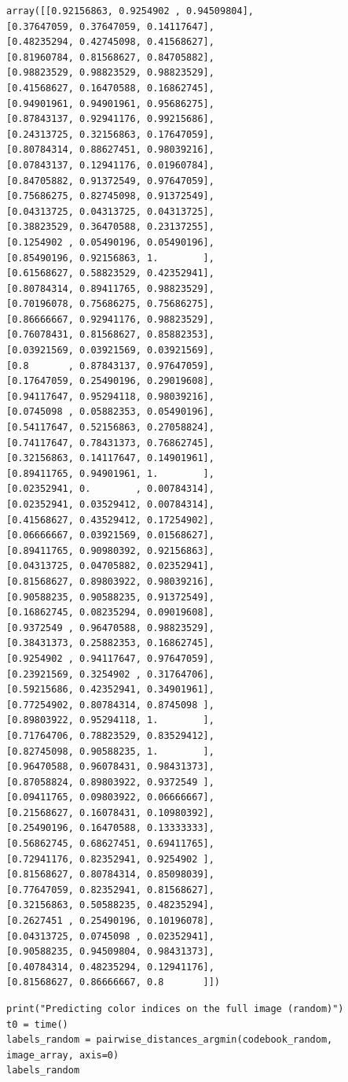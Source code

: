 \documentclass[11pt]{article}
\begin{document}
\begin{verbatim}
array([[0.92156863, 0.9254902 , 0.94509804],
[0.37647059, 0.37647059, 0.14117647],
[0.48235294, 0.42745098, 0.41568627],
[0.81960784, 0.81568627, 0.84705882],
[0.98823529, 0.98823529, 0.98823529],
[0.41568627, 0.16470588, 0.16862745],
[0.94901961, 0.94901961, 0.95686275],
[0.87843137, 0.92941176, 0.99215686],
[0.24313725, 0.32156863, 0.17647059],
[0.80784314, 0.88627451, 0.98039216],
[0.07843137, 0.12941176, 0.01960784],
[0.84705882, 0.91372549, 0.97647059],
[0.75686275, 0.82745098, 0.91372549],
[0.04313725, 0.04313725, 0.04313725],
[0.38823529, 0.36470588, 0.23137255],
[0.1254902 , 0.05490196, 0.05490196],
[0.85490196, 0.92156863, 1.        ],
[0.61568627, 0.58823529, 0.42352941],
[0.80784314, 0.89411765, 0.98823529],
[0.70196078, 0.75686275, 0.75686275],
[0.86666667, 0.92941176, 0.98823529],
[0.76078431, 0.81568627, 0.85882353],
[0.03921569, 0.03921569, 0.03921569],
[0.8       , 0.87843137, 0.97647059],
[0.17647059, 0.25490196, 0.29019608],
[0.94117647, 0.95294118, 0.98039216],
[0.0745098 , 0.05882353, 0.05490196],
[0.54117647, 0.52156863, 0.27058824],
[0.74117647, 0.78431373, 0.76862745],
[0.32156863, 0.14117647, 0.14901961],
[0.89411765, 0.94901961, 1.        ],
[0.02352941, 0.        , 0.00784314],
[0.02352941, 0.03529412, 0.00784314],
[0.41568627, 0.43529412, 0.17254902],
[0.06666667, 0.03921569, 0.01568627],
[0.89411765, 0.90980392, 0.92156863],
[0.04313725, 0.04705882, 0.02352941],
[0.81568627, 0.89803922, 0.98039216],
[0.90588235, 0.90588235, 0.91372549],
[0.16862745, 0.08235294, 0.09019608],
[0.9372549 , 0.96470588, 0.98823529],
[0.38431373, 0.25882353, 0.16862745],
[0.9254902 , 0.94117647, 0.97647059],
[0.23921569, 0.3254902 , 0.31764706],
[0.59215686, 0.42352941, 0.34901961],
[0.77254902, 0.80784314, 0.8745098 ],
[0.89803922, 0.95294118, 1.        ],
[0.71764706, 0.78823529, 0.83529412],
[0.82745098, 0.90588235, 1.        ],
[0.96470588, 0.96078431, 0.98431373],
[0.87058824, 0.89803922, 0.9372549 ],
[0.09411765, 0.09803922, 0.06666667],
[0.21568627, 0.16078431, 0.10980392],
[0.25490196, 0.16470588, 0.13333333],
[0.56862745, 0.68627451, 0.69411765],
[0.72941176, 0.82352941, 0.9254902 ],
[0.81568627, 0.80784314, 0.85098039],
[0.77647059, 0.82352941, 0.81568627],
[0.32156863, 0.50588235, 0.48235294],
[0.2627451 , 0.25490196, 0.10196078],
[0.04313725, 0.0745098 , 0.02352941],
[0.90588235, 0.94509804, 0.98431373],
[0.40784314, 0.48235294, 0.12941176],
[0.81568627, 0.86666667, 0.8       ]])
\end{verbatim}

\begin{verbatim}
print("Predicting color indices on the full image (random)")
t0 = time()
labels_random = pairwise_distances_argmin(codebook_random, image_array, axis=0)
labels_random
\end{verbatim}
\end{document}
